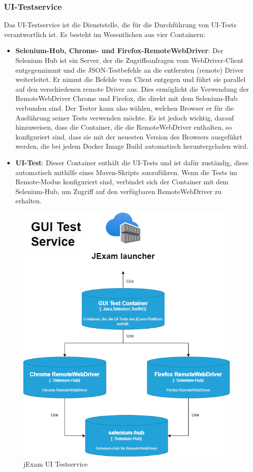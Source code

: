 \subsubsection{UI-Testservice}

Das UI-Testservice ist die Dienststelle, die für die Durchführung
von UI-Tests verantwortlich ist. Es besteht im Wesentlichen aus
vier Containern:

\begin{itemize}
    \setlength\itemsep{1em}

    \item[] \textbf{Selenium-Hub, Chrome- und Firefox-RemoteWebDriver}:
    Der Selenium Hub ist ein Server, der die Zugriffsanfragen vom 
    WebDriver-Client entgegennimmt und die JSON-Testbefehle an die 
    entfernten (remote) Driver weiterleitet. Er nimmt die Befehle vom 
    Client entgegen und führt sie parallel auf den verschiedenen 
    remote Driver aus. Dies ermöglicht die Verwendung der 
    RemoteWebDriver Chrome und Firefox, die direkt mit dem
    Selenium-Hub verbunden sind. Der Tester kann also wählen,
    welchen Browser er für die Ausführung seiner Tests verwenden
    möchte. Es ist jedoch wichtig, darauf hinzuweisen, dass die 
    Container, die die RemoteWebDriver enthalten, so konfiguriert 
    sind, dass sie mit der neuesten Version des Browsers ausgeführt 
    werden, die bei jedem Docker Image Build automatisch 
    heruntergeladen wird.

    \item[] \textbf{UI-Test}: Dieser Container enthält die UI-Tests
    und ist dafür zuständig, diese automatisch mithilfe eines
    Maven-Skripts auszuführen. Wenn die Tests im Remote-Modus
    konfiguriert sind, verbindet sich der Container mit dem
    Selenium-Hub, um Zugriff auf den verfügbaren RemoteWebDriver
    zu erhalten.
\end{itemize}

\begin{figure}[H]
    \centering
    \includegraphics[scale=0.6]{images/gui.drawio}
    \caption{jExam UI Testservice} \label{fig:ui}
\end{figure}